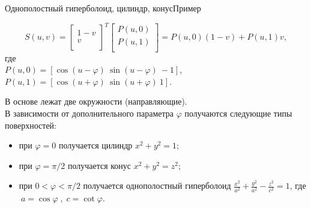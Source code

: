 \documentclass{beamer}
\begin{document}
			\begin{frame}{Однополостный гиперболоид, цилиндр, конус}{Пример}
				
				\[
					S(u,v) = 
					\begin{bmatrix}
						1-v \\
						v \\
					\end{bmatrix}^T
					\begin{bmatrix}
						P(u,0) \\
						P(u,1) \\
					\end{bmatrix}
					=
					P(u,0)(1-v)+P(u,1)v
					,
					\]
					где \\ $P(u,0)=
					[
						\cos (u-\varphi)~
						\sin (u-\varphi)~
						-1
					]$, $P(u,1)=[
						\cos(u+\varphi)~
						\sin(u+\varphi)~
						1
					]$.

					В основе лежат две окружности (направляющие). \\
					В зависимости от дополнительного параметра $\varphi$ получаются следующие типы поверхностей:
					\begin{itemize}
						\item 
						при $ \varphi=0 $ получается цилиндр $x^2+y^2=1$;
						\item
						при $ \varphi=\pi/2 $ получается конус $x^2+y^2=z^2$;
						\item
						при $ 0<\varphi<\pi/2 $ получается однополостный гиперболоид $\tfrac{x^2}{a^2}+\tfrac{y^2}{a^2}-\tfrac{z^2}{c^2}=1$, где $ \ a=\cos\varphi\;,\; c=\cot \varphi$.
					\end{itemize}


		\end{frame}
\end{document}
